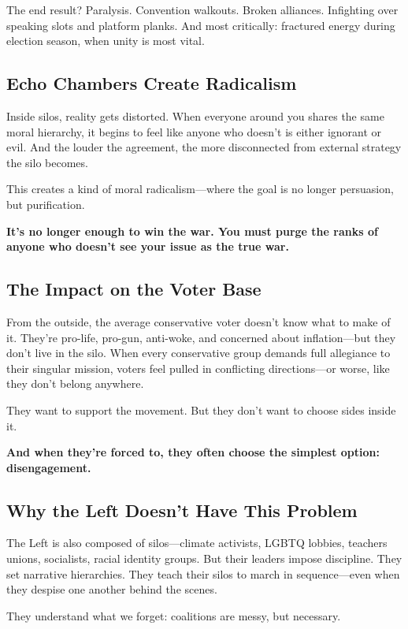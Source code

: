 The end result? Paralysis. Convention walkouts. Broken alliances. Infighting over speaking slots and platform planks. And most critically: fractured energy during election season, when unity is most vital.

\subsection*{Echo Chambers Create Radicalism}

Inside silos, reality gets distorted. When everyone around you shares the same moral hierarchy, it begins to feel like anyone who doesn’t is either ignorant or evil. And the louder the agreement, the more disconnected from external strategy the silo becomes.

This creates a kind of moral radicalism—where the goal is no longer persuasion, but purification.

\textbf{It’s no longer enough to win the war. You must purge the ranks of anyone who doesn’t see your issue as the true war.}

\subsection*{The Impact on the Voter Base}

From the outside, the average conservative voter doesn’t know what to make of it. They’re pro-life, pro-gun, anti-woke, and concerned about inflation—but they don’t live in the silo. When every conservative group demands full allegiance to their singular mission, voters feel pulled in conflicting directions—or worse, like they don’t belong anywhere.

They want to support the movement. But they don’t want to choose sides inside it.

\textbf{And when they’re forced to, they often choose the simplest option: disengagement.}

\subsection*{Why the Left Doesn’t Have This Problem}

The Left is also composed of silos—climate activists, LGBTQ lobbies, teachers unions, socialists, racial identity groups. But their leaders impose discipline. They set narrative hierarchies. They teach their silos to march in sequence—even when they despise one another behind the scenes.

They understand what we forget: coalitions are messy, but necessary.

